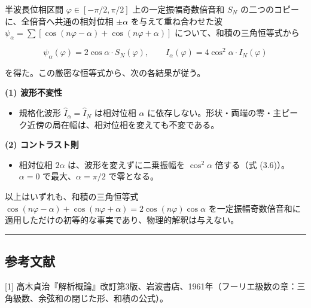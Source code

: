 \documentclass[
]{ltjsarticle}
\providecommand{\tightlist}{%
  \setlength{\itemsep}{0pt}\setlength{\parskip}{0pt}}
\begin{document}
半波長位相区間 \(\varphi\in[-\pi/2,\pi/2]\) 上の一定振幅奇数倍音和
\(S_N\) の二つのコピーに、全倍音へ共通の相対位相 \(\pm\alpha\)
を与えて重ね合わせた波
\(\psi_\alpha=\sum[\cos(n\varphi-\alpha)+\cos(n\varphi+\alpha)]\)
について、和積の三角恒等式から

\[
\psi_\alpha(\varphi)=2\cos\alpha\cdot S_N(\varphi),
\qquad
I_\alpha(\varphi)=4\cos^2\!\alpha\cdot I_N(\varphi)
\]

を得た。この厳密な恒等式から、次の各結果が従う。

\textbf{(1) 波形不変性}

\begin{itemize}
\tightlist
\item
  規格化波形 \(\widehat{I}_\alpha=\widehat{I}_N\) は相対位相 \(\alpha\)
  に依存しない。形状・両端の零・主ピーク近傍の局在幅は、相対位相を変えても不変である。
\end{itemize}

\textbf{(2) コントラスト則}

\begin{itemize}
\tightlist
\item
  相対位相 \(2\alpha\) は、波形を変えずに二乗振幅を \(\cos^2\!\alpha\)
  倍する（式 (3.6)）。\(\alpha=0\) で最大、\(\alpha=\pi/2\) で零となる。
\end{itemize}

以上はいずれも、和積の三角恒等式
\(\cos(n\varphi-\alpha)+\cos(n\varphi+\alpha)=2\cos(n\varphi)\cos\alpha\)
を一定振幅奇数倍音和に適用しただけの初等的な事実であり、物理的解釈は与えない。

\begin{center}\rule{0.5\linewidth}{0.5pt}\end{center}

\subsection{参考文献}\label{ux53c2ux8003ux6587ux732e}

{[}1{]}
高木貞治『解析概論』改訂第3版、岩波書店、1961年（フーリエ級数の章：三角級数、余弦和の閉じた形、和積の公式）。
\end{document}
